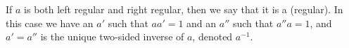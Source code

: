If $a$ is both left regular and right regular, then we say that it is a  (regular). In this case we have an $a'$ such that $aa' = 1$ and an $a''$ such that $a''a = 1$, and $a' = a''$ is the unique two-sided inverse of $a$, denoted $a^{-1}$.
